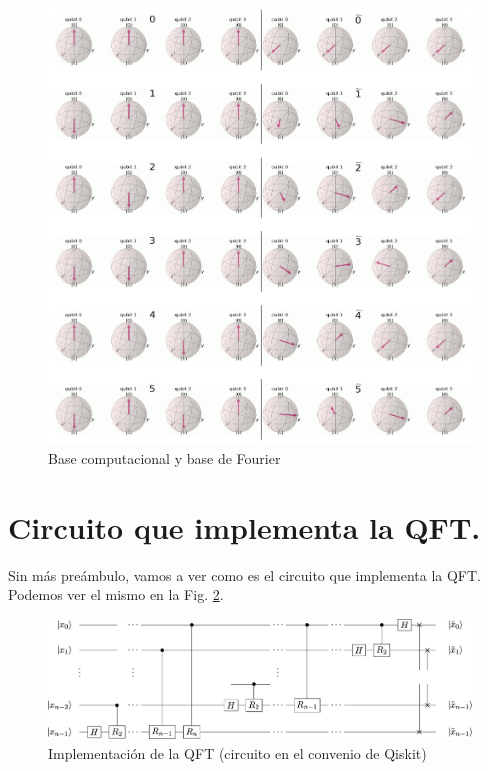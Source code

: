\documentclass[a4paper,11pt]{book} %
\numberwithin{equation}{chapter}
\begin{document}
	\begin{figure}[H]
	\centering 
	\includegraphics[width=1\linewidth]{Figuras/Fig_subfig_QFT_compu_fourier_bases.png}
	\caption{Base computacional y base de Fourier}
	\label{Fig_QFT_compu_fourier_bases}
	\end{figure}

\newpage

	\section{Circuito que implementa la QFT.}

Sin más preámbulo, vamos a ver como es el circuito que implementa la QFT. Podemos ver el mismo en la Fig. \ref{Fig_QFT_circuit}.

	\begin{figure}[H]
	\centering 
	\includegraphics[width=1\linewidth]{Figuras/Fig_QFT_circuit.png}
	\caption{Implementación de la QFT (circuito en el convenio de Qiskit)}
	\label{Fig_QFT_circuit}
	\end{figure}
\end{document}
